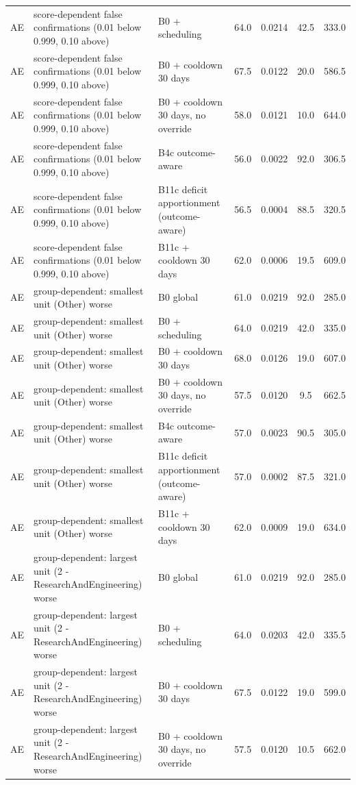 \begin{longtable}{lp{5.2cm}p{4.4cm}cccc}
AE & score-dependent false confirmations (0.01 below 0.999, 0.10 above) & B0 + scheduling & 64.0 & 0.0214 & 42.5 & 333.0 \\
AE & score-dependent false confirmations (0.01 below 0.999, 0.10 above) & B0 + cooldown 30 days & 67.5 & 0.0122 & 20.0 & 586.5 \\
AE & score-dependent false confirmations (0.01 below 0.999, 0.10 above) & B0 + cooldown 30 days, no override & 58.0 & 0.0121 & 10.0 & 644.0 \\
AE & score-dependent false confirmations (0.01 below 0.999, 0.10 above) & B4c outcome-aware & 56.0 & 0.0022 & 92.0 & 306.5 \\
AE & score-dependent false confirmations (0.01 below 0.999, 0.10 above) & B11c deficit apportionment (outcome-aware) & 56.5 & 0.0004 & 88.5 & 320.5 \\
AE & score-dependent false confirmations (0.01 below 0.999, 0.10 above) & B11c + cooldown 30 days & 62.0 & 0.0006 & 19.5 & 609.0 \\
AE & group-dependent: smallest unit (Other) worse & B0 global & 61.0 & 0.0219 & 92.0 & 285.0 \\
AE & group-dependent: smallest unit (Other) worse & B0 + scheduling & 64.0 & 0.0219 & 42.0 & 335.0 \\
AE & group-dependent: smallest unit (Other) worse & B0 + cooldown 30 days & 68.0 & 0.0126 & 19.0 & 607.0 \\
AE & group-dependent: smallest unit (Other) worse & B0 + cooldown 30 days, no override & 57.5 & 0.0120 & 9.5 & 662.5 \\
AE & group-dependent: smallest unit (Other) worse & B4c outcome-aware & 57.0 & 0.0023 & 90.5 & 305.0 \\
AE & group-dependent: smallest unit (Other) worse & B11c deficit apportionment (outcome-aware) & 57.0 & 0.0002 & 87.5 & 321.0 \\
AE & group-dependent: smallest unit (Other) worse & B11c + cooldown 30 days & 62.0 & 0.0009 & 19.0 & 634.0 \\
AE & group-dependent: largest unit (2 - ResearchAndEngineering) worse & B0 global & 61.0 & 0.0219 & 92.0 & 285.0 \\
AE & group-dependent: largest unit (2 - ResearchAndEngineering) worse & B0 + scheduling & 64.0 & 0.0203 & 42.0 & 335.5 \\
AE & group-dependent: largest unit (2 - ResearchAndEngineering) worse & B0 + cooldown 30 days & 67.5 & 0.0122 & 19.0 & 599.0 \\
AE & group-dependent: largest unit (2 - ResearchAndEngineering) worse & B0 + cooldown 30 days, no override & 57.5 & 0.0120 & 10.5 & 662.0 \\

\end{longtable}
